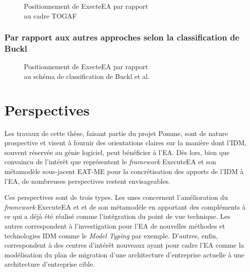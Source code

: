 \begin{figure}[!ht]
    \begin{center}
	
    \end{center}
	\caption{Positionnement de ExecteEA par rapport\\ au cadre TOGAF}
	\label{fig:positionTogaf}
\end{figure}

            \subsubsection{Par rapport aux autres approches selon la classification de Buckl}

\begin{figure}[!ht]
	
	\caption{Positionnement de ExecteEA par rapport\\au schéma de classification de
	Buckl et al. \protect\cite{buckl2009classifying}}
	\label{fig:positionBuckl}
\end{figure}

\section{Perspectives}

Les travaux de cette thèse, faisant partie du projet Pomme, sont de nature prospective et visent à fournir 
des orientations claires sur la manière dont l'IDM, souvent réservée au génie logiciel, peut bénéficier à l'EA.
Dès lors, bien que convaincu de l'intérêt que représentent le \emph{framework} ExecuteEA et son métamodèle sous-jacent
EAT-ME pour la concrétisation des apports de l'IDM à l'EA, de nombreuses perspectives restent envisageables.

Ces perspectives sont de trois types. Les unes concernent l'amélioration du \emph{framework} ExecuteEA et 
et de son métamodèle en apportant des compléments à ce qui a déjà été réalisé comme l'intégration
du point de vue technique. Les autres correspondent à l'investigation pour l'EA
de nouvelles méthodes et technologies IDM comme le \emph{Model Typing} par exemple. D'autres, enfin,
correspondent à des centres d'intérêt nouveaux ayant pour cadre l'EA comme la modélisation du plan de migration
d'une architecture d'entreprise actuelle à une architecture d'entreprise cible.



